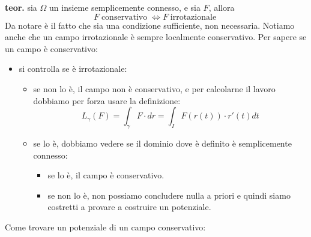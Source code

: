 \newline
\textbf{teor.} sia $\Omega$ un insieme semplicemente connesso, e sia $F$, allora
\[
    F \; \text{conservativo}\; \Longleftrightarrow F \; \text{irrotazionale}\;
\]
Da notare è il fatto che sia una condizione sufficiente, non necessaria.\newline
Notiamo anche che un campo irrotazionale è sempre localmente conservativo.\newline
\newline
Per sapere se un campo è conservativo:
\begin{itemize}
    \item si controlla se è irrotazionale:
    \begin{itemize}
        \item se non lo è, il campo non è conservativo, e per calcolarne il lavoro dobbiamo per forza usare la definizione:
        \[
            L_\gamma (F) = \int_{\gamma} F \cdot dr = \int_{I} F(r(t))\cdot r'(t) dt
        \]
        \item se lo è, dobbiamo vedere se il dominio dove è definito è semplicemente connesso:
        \begin{itemize}
            \item se lo è, il campo è conservativo.
            \item se non lo è, non possiamo concludere nulla a priori e quindi siamo costretti a provare a costruire un potenziale.
        \end{itemize}
    \end{itemize}
\end{itemize}
Come trovare un potenziale di un campo conservativo:
